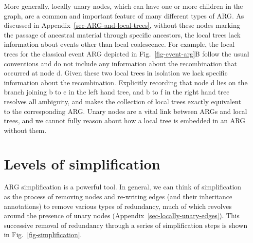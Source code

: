 \documentclass[9pt,twocolumn,twoside]{gsajnl}
\newcommand{\noderef}[1]{\textsf{#1}}
\begin{document}
More generally, locally unary nodes,
which can have one or more children in the graph,
are a common and important feature
of many different types of ARG.
As discussed in Appendix~\ref{sec-ARG-and-local-trees},
without these nodes marking the passage
of ancestral material through specific ancestors, the local trees
lack information about events other than local coalescence.
For example, the local trees for the classical event ARG
depicted in Fig.~\ref{fig-event-arg}B follow the usual conventions
and do not include any information about the recombination
that occurred at node \noderef{d}. Given these two local trees
in isolation
we lack specific information about the recombination.
Explicitly recording that node \noderef{d} lies on the
branch joining \noderef{b} to \noderef{e} in the left hand
tree, and \noderef{b} to \noderef{f} in the right hand tree
resolves all ambiguity, and makes the collection of local
trees exactly equivalent to the corresponding ARG.
Unary nodes are a vital link between ARGs and local trees, and we
cannot fully reason about how a local tree is embedded in an ARG
without them.

\section{Levels of simplification}
\label{sec-ARG-simplification}
ARG simplification is a powerful tool.
In general, we can think of
simplification as the process
of removing nodes and re-writing edges (and their inheritance annotations)
to remove various types of redundancy, much of which
revolves around the presence of unary nodes (Appendix~\ref{sec-locally-unary-edges}).
This successive removal of redundancy
through a series of simplification steps is shown
in Fig.~\ref{fig-simplification}.
\end{document}
